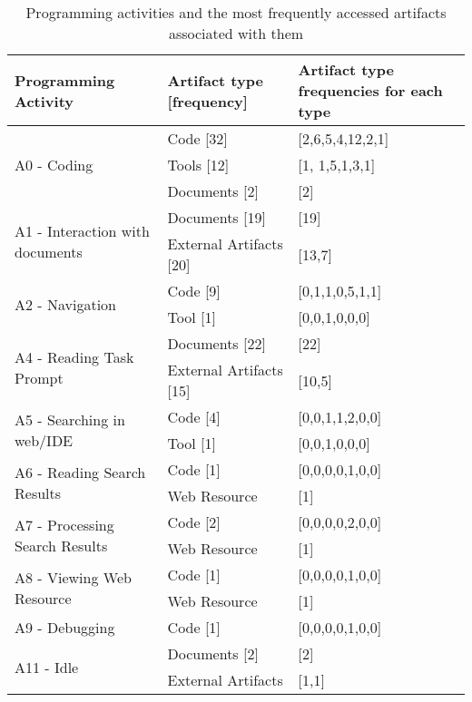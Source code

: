 
\begin{table*}
\caption{Programming activities and the most frequently accessed artifacts associated with them}
\begin{tabular}{lll}
\toprule
Programming Activity & Artifact type [frequency] & Artifact type frequencies for each type \\
\midrule
\multirow{3}{*}{A0 - Coding} & Code [32] & [2,6,5,4,12,2,1] \\
& Tools [12] & [1, 1,5,1,3,1] \\
& Documents [2] & [2] \\
\midrule
\multirow{2}{*}{A1 - Interaction with documents} & Documents [19] & [19] \\
& External Artifacts [20] & [13,7] \\
\midrule
\multirow{2}{*}{A2 - Navigation} & Code [9] & [0,1,1,0,5,1,1] \\
& Tool [1] & [0,0,1,0,0,0] \\
\midrule
\multirow{2}{*}{A4 - Reading Task Prompt} & Documents [22] & [22] \\
& External Artifacts [15] & [10,5] \\
\midrule
\multirow{2}{*}{A5 - Searching in web/IDE} & Code [4] & [0,0,1,1,2,0,0] \\
& Tool [1] & [0,0,1,0,0,0] \\
\midrule
\multirow{2}{*}{A6 - Reading Search Results} & Code [1] & [0,0,0,0,1,0,0] \\
& Web Resource & [1] \\
\midrule
\multirow{2}{*}{A7 - Processing Search Results} & Code [2] & [0,0,0,0,2,0,0] \\
& Web Resource & [1] \\
\midrule
\multirow{2}{*}{A8 - Viewing Web Resource} & Code [1] & [0,0,0,0,1,0,0] \\
& Web Resource & [1] \\
\midrule
A9 - Debugging & Code [1] & [0,0,0,0,1,0,0] \\
\midrule
\multirow{2}{*}{A11 - Idle} & Documents [2] & [2] \\
& External Artifacts & [1,1] \\
\bottomrule
\end{tabular}
\end{table*}